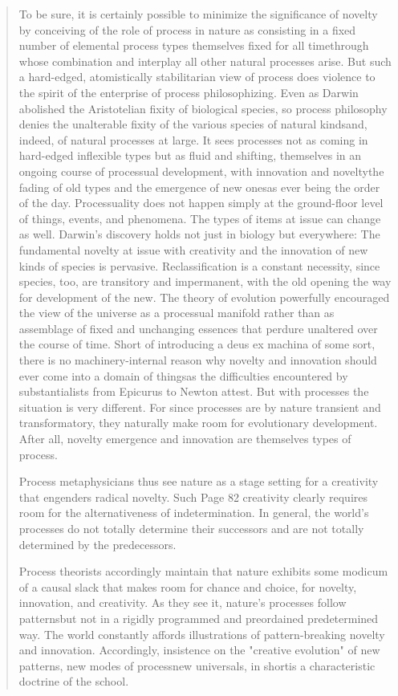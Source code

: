 \documentclass[a4paper]{Thesis}
\begin{document}
\begin{quotation}
		To be sure, it is certainly possible to minimize the significance of novelty by conceiving of
		the role of process in nature as consisting in a fixed number of elemental process types
		themselves fixed for all timethrough whose combination and interplay all other natural
		processes arise. But such a hard-edged, atomistically stabilitarian view of process does
		violence to the spirit of the enterprise of process philosophizing. Even as Darwin
		abolished the Aristotelian fixity of biological species, so process philosophy denies the
		unalterable fixity of the various species of natural kindsand, indeed, of natural processes
		at large. It sees processes not as coming in hard-edged inflexible types but as fluid and
		shifting, themselves in an ongoing course of processual development, with innovation and
		noveltythe fading of old types and the emergence of new onesas ever being the order of
		the day. Processuality does not happen simply at the ground-floor level of things, events,
		and phenomena. The types of items at issue can change as well. Darwin's discovery holds
		not just in biology but everywhere: The fundamental novelty at issue with creativity and
		the innovation of new kinds of species is pervasive. Reclassification is a constant
		necessity, since species, too, are transitory and impermanent, with the old opening the
		way for development of the new. The theory of evolution powerfully encouraged the view
		of the universe as a processual manifold rather than as assemblage of fixed and
		unchanging essences that perdure unaltered over the course of time. Short of introducing
		a deus ex machina of some sort, there is no machinery-internal reason why novelty and
		innovation should ever come into a domain of thingsas the difficulties encountered by
		substantialists from Epicurus to Newton attest. But with processes the situation is very
		different. For since processes are by nature transient and transformatory, they naturally
		make room for evolutionary development. After all, novelty emergence and innovation
		are themselves types of process.
		
		Process metaphysicians thus see nature as a stage setting for a creativity that engenders
		radical novelty. Such
		Page 82
		creativity clearly requires room for the alternativeness of indetermination. In general, the
		world's processes do not totally determine their successors and are not totally determined
		by the predecessors. 
		
		Process theorists accordingly maintain that nature exhibits some
		modicum of a causal slack that makes room for chance and choice, for novelty,
		innovation, and creativity. As they see it, nature's processes follow patternsbut not in a
		rigidly programmed and preordained predetermined way. The world constantly affords
		illustrations of pattern-breaking novelty and innovation. Accordingly, insistence on the
		"creative evolution" of new patterns, new modes of processnew universals, in shortis a
		characteristic doctrine of the school.
		

\end{quotation}
\end{document}
